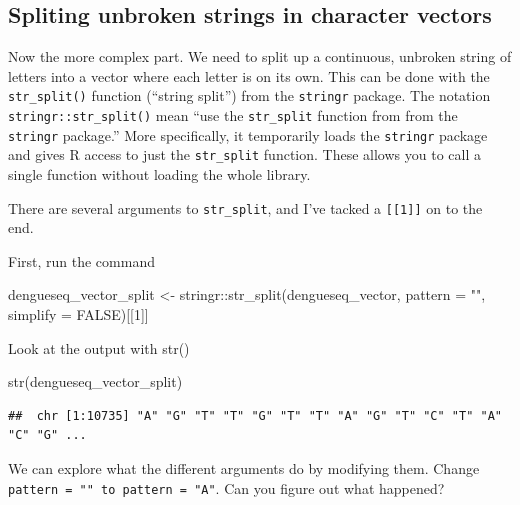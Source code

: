 \documentclass[
]{book}
\newenvironment{Shaded}{\begin{snugshade}}{\end{snugshade}}
\newcommand{\AttributeTok}[1]{\textcolor[rgb]{0.77,0.63,0.00}{#1}}
\newcommand{\ConstantTok}[1]{\textcolor[rgb]{0.00,0.00,0.00}{#1}}
\newcommand{\DecValTok}[1]{\textcolor[rgb]{0.00,0.00,0.81}{#1}}
\newcommand{\FunctionTok}[1]{\textcolor[rgb]{0.00,0.00,0.00}{#1}}
\newcommand{\NormalTok}[1]{#1}
\newcommand{\OtherTok}[1]{\textcolor[rgb]{0.56,0.35,0.01}{#1}}
\newcommand{\SpecialCharTok}[1]{\textcolor[rgb]{0.00,0.00,0.00}{#1}}
\newcommand{\StringTok}[1]{\textcolor[rgb]{0.31,0.60,0.02}{#1}}
\begin{document}
\hypertarget{spliting-unbroken-strings-in-character-vectors}{%
\subsection{Spliting unbroken strings in character vectors}\label{spliting-unbroken-strings-in-character-vectors}}

Now the more complex part. We need to split up a continuous, unbroken string of letters into a vector where each letter is on its own. This can be done with the \texttt{str\_split()} function (``string split'') from the \texttt{stringr} package. The notation \texttt{stringr::str\_split()} mean ``use the \texttt{str\_split} function from from the \texttt{stringr} package.'' More specifically, it temporarily loads the \texttt{stringr} package and gives R access to just the \texttt{str\_split} function. These allows you to call a single function without loading the whole library.

There are several arguments to \texttt{str\_split}, and I've tacked a \texttt{{[}{[}1{]}{]}} on to the end.

First, run the command

\begin{Shaded}
\begin{Highlighting}[]
\NormalTok{dengueseq\_vector\_split }\OtherTok{\textless{}{-}}\NormalTok{ stringr}\SpecialCharTok{::}\FunctionTok{str\_split}\NormalTok{(dengueseq\_vector,}
                                       \AttributeTok{pattern =} \StringTok{""}\NormalTok{,}
                                       \AttributeTok{simplify =} \ConstantTok{FALSE}\NormalTok{)[[}\DecValTok{1}\NormalTok{]]}
\end{Highlighting}
\end{Shaded}

Look at the output with str()

\begin{Shaded}
\begin{Highlighting}[]
\FunctionTok{str}\NormalTok{(dengueseq\_vector\_split)}
\end{Highlighting}
\end{Shaded}

\begin{verbatim}
##  chr [1:10735] "A" "G" "T" "T" "G" "T" "T" "A" "G" "T" "C" "T" "A" "C" "G" ...
\end{verbatim}

We can explore what the different arguments do by modifying them. Change \texttt{pattern\ =\ ""\ to\ pattern\ =\ "A"}. Can you figure out what happened?
\end{document}
